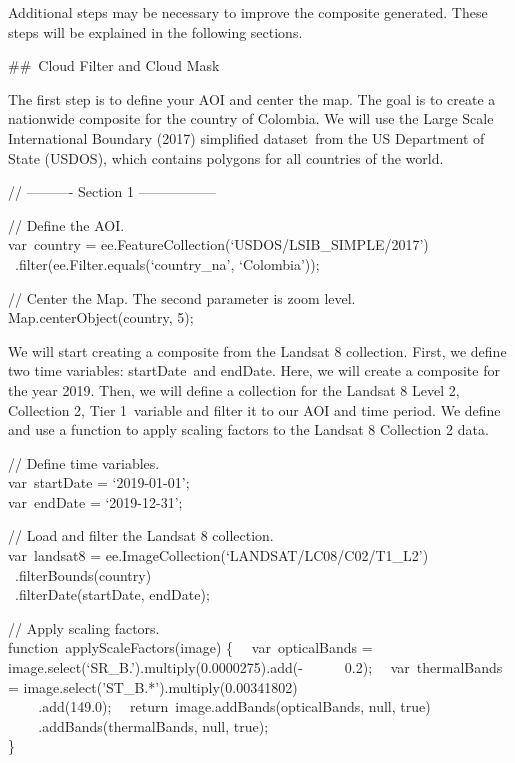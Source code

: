 \documentclass[
  letterpaper,
  DIV=11,
  numbers=noendperiod]{scrreprt}
\begin{document}
Additional steps may be necessary to improve the composite generated.
These steps will be explained in the following sections.

\#\#~Cloud Filter and Cloud Mask

The first step is to define your AOI and center the map. The goal is to
create a nationwide composite for the country of Colombia. We will use
the Large Scale International Boundary (2017) simplified dataset~from
the US Department of State (USDOS), which contains polygons for all
countries of the world.

// ---------- Section 1 -----------------

// Define the AOI.\\
var~country = ee.FeatureCollection(`USDOS/LSIB\_SIMPLE/2017')\\
\hspace*{0.333em} ~.filter(ee.Filter.equals(`country\_na', `Colombia'));

// Center the Map. The second parameter is zoom level.\\
Map.centerObject(country, 5);

We will start creating a composite from the Landsat 8 collection. First,
we define two time variables: startDate~and endDate. Here, we will
create a composite for the year 2019. Then, we will define a collection
for the Landsat 8 Level 2, Collection 2, Tier 1~variable and filter it
to our AOI and time period. We define and use a function to apply
scaling factors to the Landsat 8 Collection 2 data.

// Define time variables.\\
var~startDate = `2019-01-01';\\
var~endDate = `2019-12-31';

// Load and filter the Landsat 8 collection.\\
var~landsat8 = ee.ImageCollection(`LANDSAT/LC08/C02/T1\_L2')\\
\hspace*{0.333em} ~.filterBounds(country)\\
\hspace*{0.333em} ~.filterDate(startDate, endDate);

// Apply scaling factors.\\
function~applyScaleFactors(image) \{~ ~var~opticalBands =
image.select(`SR\_B.').multiply(0.0000275).add(-~ ~ ~ ~0.2);~
~var~thermalBands = image.select('ST\_B.*').multiply(0.00341802)\\
\hspace*{0.333em} ~ ~ ~.add(149.0);~
~return~image.addBands(opticalBands, null, true)\\
\hspace*{0.333em} ~ ~ ~.addBands(thermalBands, null, true);\\
\}
\end{document}
